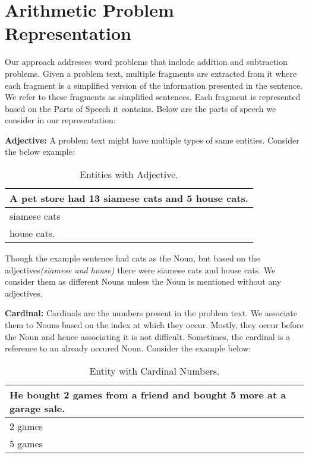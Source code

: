 \documentclass[11pt]{article}
\begin{document}
\section{Arithmetic Problem Representation}

Our approach addresses word problems that include addition and subtraction problems. Given a problem text, multiple fragments are extracted from it  where each fragment is a simplified version of the information presented in the sentence. We refer to these fragments as simplified sentences. Each fragment is represented based on the Parts of Speech it contains. Below are the parts of speech we consider in our representation:
\par



\textbf{Adjective:} A problem text might have multiple types of same entities. Consider the below example:

 \begin{table}[h!]
\centering
\begin{tabular}{ | m{25em} | }
\hline
 \textbf{A pet store had 13 siamese cats and 5 house cats.}\\
\hline
 siamese cats\\
\hline
house cats.\\
\hline
\end{tabular}
\caption{Entities with Adjective.}
\label{table:2}
\end{table}

Though the example sentence had cats as the Noun, but based on the adjectives\textit{(siamese and house)} there were siamese cats and house cats. We consider them as different Nouns unless the Noun is mentioned without any adjectives.

\textbf{Cardinal:} Cardinals are the numbers present in the problem text. We associate them to Nouns based on the index at which they occur. Mostly, they occur before the Noun and hence associating it is not difficult. Sometimes, the cardinal is a reference to an already occured Noun. Consider the example below:

\begin{table}[h!]
\centering
\begin{tabular}{ | m{25em} | }
\hline
He bought 2 games from a friend and bought 5 more at a garage sale.\\
\hline
2 games\\
\hline
5 games\\
\hline
\end{tabular}
\caption{Entity with Cardinal Numbers.}
\label{table:2}
\end{table}
\end{document}
